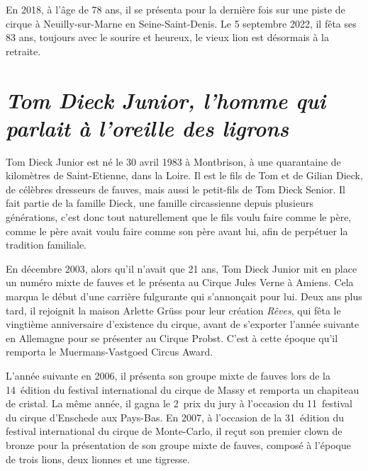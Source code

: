 En 2018, à l'âge de 78 ans, il se présenta pour la dernière fois sur une piste de cirque à Neuilly-sur-Marne en Seine-Saint-Denis. Le 5 septembre 2022, il fêta ses 83 ans, toujours avec le sourire et heureux, le vieux lion est désormais à la retraite.

\section*{\textit{Tom Dieck Junior, l'homme qui parlait à l'oreille des ligrons}}
{}

Tom Dieck Junior est né le 30 avril 1983 à Montbrison, à une quarantaine de kilomètres de Saint-Etienne, dans la Loire. Il est le fils de Tom et de Gilian Dieck, de célèbres dresseurs de fauves, mais aussi le petit-fils de Tom Dieck Senior. Il fait partie de la famille Dieck, une famille circassienne depuis plusieurs générations, c'est donc tout naturellement que le fils voulu faire comme le père, comme le père avait voulu faire comme son père avant lui, afin de perpétuer la tradition familiale.

En décembre 2003, alors qu'il n'avait que 21 ans, Tom Dieck Junior mit en place un numéro mixte de fauves et le présenta au Cirque Jules Verne à Amiens. Cela marqua le début d'une carrière fulgurante qui s'annonçait pour lui. Deux ans plus tard, il rejoignit la maison Arlette Grüss pour leur création \textit{Rêves}, qui fêta le vingtième anniversaire d'existence du cirque, avant de s'exporter l'année suivante en Allemagne pour se présenter au Cirque Probst. C'est à cette époque qu'il remporta le Muermans-Vastgoed Circus Award.

L'année suivante en 2006, il présenta son groupe mixte de fauves lors de la 14\ieme~édition du festival international du cirque de Massy et remporta un chapiteau de cristal. La même année, il gagna le 2\ieme~prix du jury à l'occasion du 11\ieme~festival du cirque d'Enschede aux Pays-Bas. En 2007, à l'occasion de la 31\ieme~édition du festival international du cirque de Monte-Carlo, il reçut son premier clown de bronze pour la présentation de son groupe mixte de fauves, composé à l'époque de trois lions, deux lionnes et une tigresse.

